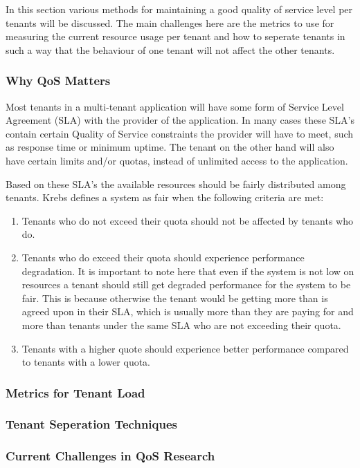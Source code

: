 In this section various methods for maintaining a good quality of service level per tenants will be discussed.
The main challenges here are the metrics to use for measuring the current resource usage per tenant and how to seperate tenants in such a way that the behaviour of one tenant will not affect the other tenants.\cite{krebs2013metrics}

\subsubsection{Why QoS Matters}
Most tenants in a multi-tenant application will have some form of Service Level Agreement (SLA) with the provider of the application.
In many cases these SLA's contain certain Quality of Service constraints the provider will have to meet, such as response time or minimum uptime. 
The tenant on the other hand will also have certain limits and/or quotas, instead of unlimited access to the application.

Based on these SLA's the available resources should be fairly distributed among tenants.
Krebs\cite{krebs2013metrics} defines a system as fair when the following criteria are met:
\begin{enumerate}
	\item Tenants who do not exceed their quota should not be affected by tenants who do.
	\item Tenants who do exceed their quota should experience performance degradation. 
		It is important to note here that even if the system is not low on resources a tenant should still get degraded performance for the system to be fair.
		This is because otherwise the tenant would be getting more than is agreed upon in their SLA, which is usually more than they are paying for and more than tenants under the same SLA who are not exceeding their quota.
	\item Tenants with a higher quote should experience better performance compared to tenants with a lower quota.
\end{enumerate}

\subsubsection{Metrics for Tenant Load}

\subsubsection{Tenant Seperation Techniques}

\subsubsection{Current Challenges in QoS Research}
